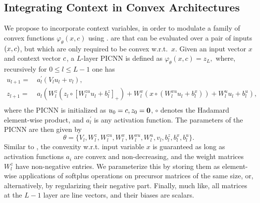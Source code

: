 \subsection{Integrating Context in Convex Architectures}
We propose to incorporate context variables, in order to modulate a family of convex functions $\varphi_{\theta}(x, c)$
using .  are  that can be evaluated over a pair of inputs $(x,c)$, but which are only required to be convex w.r.t.~$x$. Given an input vector $x$ and context vector $c$, a ${L}$-layer \acrshort{PICNN} is defined as $\varphi_\theta(x, c) = z_{L},$ where, recursively for $0 \leq {l} \leq {L}-1$ one has
\begin{equation} \label{eq:picnn}
\begin{aligned} 
u_{{l}+1} =&\, a^\prime_{l}\left(V_{l} u_{l}+v_{l}\right), \\
z_{{l}+1} =&\, a_{l}\left(W_{l}^{z}\left(z_{l} \circ\left[W_{l}^{z u} u_{l}+b_{l}^{z}\right]_+\right)+\right.
\left.W_{l}^{x}\left(x \circ(W_{l}^{x u} u_{l}+b_{l}^{x})\right)+W_{l}^{u} u_{l}+b_{l}^u\right), \\
\end{aligned}
\end{equation}
where the \acrshort{PICNN} is initialized as $u_{0}=c, z_0 = \mathbf{0}$, $\circ$ denotes the Hadamard element-wise product, and $a^\prime_{l}$ is any activation function. The parameters of the \acrshort{PICNN} are then given by
$$\theta = \{ V_{l}, W_{l}^{z}, W_{l}^{z u}, W_{l}^{x}, W_{l}^{x u} , W_{l}^{u}, v_{l}, b_{l}^{z}, b_{l}^{x}, b_{l}^u \}.$$ 
Similar to , the convexity w.r.t. input variable $x$ is guaranteed as long as activation functions $a_i$ are convex and non-decreasing, and the weight matrices $W_{l}^{z}$ have non-negative entries. We parameterize this by storing them as element-wise applications of softplus operations on precursor matrices of the same size, or, alternatively, by regularizing their negative part. Finally, much like, all matrices at the ${L}-1$ layer are line vectors, and their biases are scalars.

